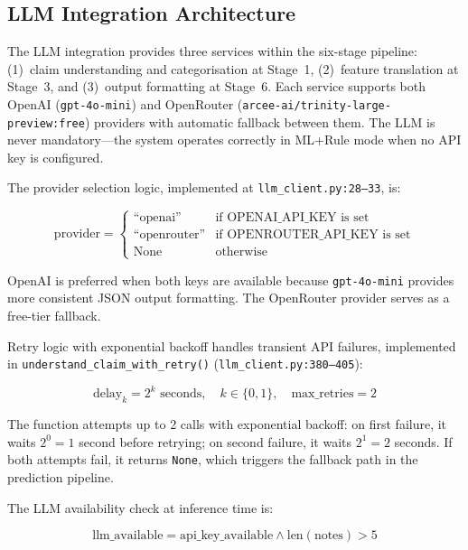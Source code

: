 \documentclass[10pt,a4paper]{article}
\begin{document}
\subsection{LLM Integration Architecture}
\label{sec:llm-integration}

The LLM integration provides three services within the six-stage pipeline: (1)~claim understanding and categorisation at Stage~1, (2)~feature translation at Stage~3, and (3)~output formatting at Stage~6. Each service supports both OpenAI (\texttt{gpt-4o-mini}) and OpenRouter (\texttt{arcee-ai/trinity-large-preview:free}) providers with automatic fallback between them. The LLM is never mandatory---the system operates correctly in ML+Rule mode when no API key is configured.

The provider selection logic, implemented at \texttt{llm\_client.py:28--33}, is:

\begin{equation}
\text{provider} = \begin{cases}
\text{``openai''}     & \text{if OPENAI\_API\_KEY is set} \\
\text{``openrouter''} & \text{if OPENROUTER\_API\_KEY is set} \\
\text{None}           & \text{otherwise}
\end{cases}
\label{eq:provider-select}
\end{equation}

OpenAI is preferred when both keys are available because
\texttt{gpt-4o-mini} provides more consistent JSON output formatting.
The OpenRouter provider serves as a free-tier fallback.

Retry logic with exponential backoff handles transient API
failures, implemented in
\texttt{understand\_claim\_with\_retry()}
(\texttt{llm\_client.py:380--405}):

\begin{equation}
\text{delay}_k = 2^k \text{ seconds}, \quad k \in \{0, 1\}, \quad \text{max\_retries} = 2
\label{eq:retry-backoff}
\end{equation}

The function attempts up to 2 calls with exponential backoff: on first failure, it waits $2^0 = 1$ second before retrying; on second failure, it waits $2^1 = 2$ seconds. If both attempts fail, it returns \texttt{None}, which triggers the fallback path in the prediction pipeline.

The LLM availability check at inference time is:

\begin{equation}
\text{llm\_available} = \text{api\_key\_available} \land \text{len}(\text{notes}) > 5
\label{eq:llm-available}
\end{equation}
\end{document}
